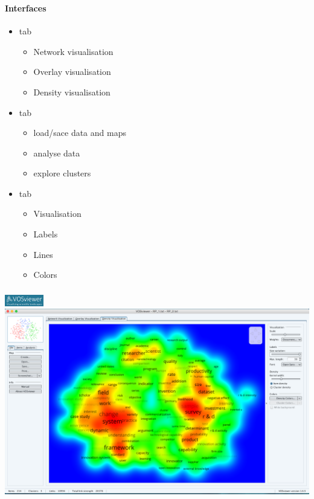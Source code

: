 \documentclass[8pt]{beamer}
\begin{document}

\begin{frame}
\frametitle{\insertsection}
\framesubtitle{Interfaces}

\begin{itemize}

\item {\color{blue}{Top}} tab 
    \begin{itemize}
    \item Network visualisation
    \item Overlay visualisation
    \item Density visualisation
    \end{itemize}

 \medskip

\item {\color{blue}{Left-hand side}} tab 
    \begin{itemize}
    \item load/sace data and maps
    \item analyse data
    \item explore clusters
    \end{itemize}

\medskip

\item {\color{blue}{Right-hand side}} tab
    \begin{itemize}
    \item Visualisation
    \item Labels
    \item Lines
    \item Colors
    \end{itemize}

\end{itemize}

\end{frame}


\begin{frame}
\frametitle{\insertsection}

\includegraphics[height=0.5cm]{vos_logo}\\
\includegraphics[width=\linewidth, frame]{vos}

\end{frame}
\end{document}
